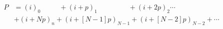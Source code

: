 \documentclass[preview]{standalone}
\begin{document}
\begin{align*}
P &= (i)_0\:\:\:\:\:\:\:\:\:\:\:\:+(i+p)_1\:\:\:\:\:\:\:\:\:\:\:\:\:\:\:\:\:\:\:\:+(i+2p)_2\cdots\\&+(i+Np)_n+(i+[N-1]p)_{N-1}+(i+[N-2]p)_{N-2}+\cdots
\end{align*}
\end{document}
